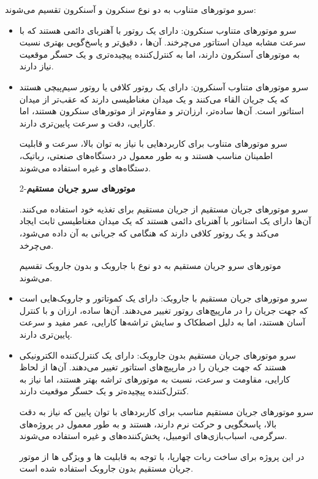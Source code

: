 سرو موتورهای متناوب به دو نوع سنکرون و آسنکرون تقسیم می‌شوند:
\begin{itemize}
\item
سرو موتورهای متناوب سنکرون: دارای یک روتور با آهنربای دائمی هستند که با سرعت مشابه میدان استاتور می‌چرخند. آن‌ها ، دقیق‌تر و پاسخ‌گویی بهتری نسبت به موتورهای آسنکرون دارند، اما به کنترل‌کننده پیچیده‌تری و یک حسگر موقعیت نیاز دارند.
\item
سرو موتورهای متناوب آسنکرون: دارای یک روتور کلافی یا روتور سیم‌پیچی هستند که یک جریان القاء می‌کنند و یک میدان مغناطیسی دارند که عقب‌‌تر از میدان استاتور است. آن‌ها ساده‌تر، ارزان‌تر و مقاوم‌تر از موتورهای سنکرون هستند، اما کارایی، دقت و سرعت پایین‌تری دارند.

سرو موتورهای متناوب برای کاربردهایی با نیاز به توان بالا، سرعت و قابلیت اطمینان مناسب هستند و به طور معمول در دستگاه‌های صنعتی، رباتیک، دستگاه‌های 
و غیره استفاده می‌شوند.

2-\textbf{موتورهای سرو جریان مستقیم}

سرو موتورهای جریان مستقیم از جریان مستقیم
برای تغذیه خود استفاده می‌کنند. آن‌ها دارای یک استاتور با آهنربای دائمی هستند که یک میدان مغناطیسی ثابت ایجاد می‌کند و یک روتور کلافی دارند که هنگامی که جریانی به آن داده می‌شود، می‌چرخد.

موتورهای سرو جریان مستقیم به دو نوع با جاروبک
\unskip{}
و بدون جاروبک
\unskip{}
 تقسیم می‌شوند.
\item
سرو موتورهای جریان مستقیم با جاروبک: دارای یک کموتاتور
\unskip{}
و جاروبک‌هایی است که جهت جریان را در مارپیچ‌های روتور تغییر می‌دهند. آن‌ها ساده، ارزان و با کنترل آسان هستند، اما به دلیل اصطکاک و سایش تراشه‌ها کارایی، عمر مفید و سرعت پایین‌تری دارند.
\item
سرو موتورهای جریان مستقیم بدون جاروبک: دارای یک کنترل‌کننده الکترونیکی هستند که جهت جریان را در مارپیچ‌های استاتور تغییر می‌دهند. آن‌ها از لحاظ کارایی، مقاومت و سرعت، نسبت به موتورهای تراشه بهتر هستند، اما نیاز به کنترل‌کننده پیچیده‌تر و یک حسگر موقعیت دارند.

سرو موتورهای جریان مستقیم مناسب برای کاربردهای با توان پایین که نیاز به دقت بالا، پاسخگویی و حرکت نرم دارند، هستند و به طور معمول در پروژه‌های سرگرمی، اسباب‌بازی‌های اتومبیل‌، پخش‌کننده‌های
و غیره استفاده می‌شوند.

در این پروژه برای ساخت ربات چهارپا، با توجه به قابلیت ها و ویژگی ها از موتور جریان مستقیم بدون جاروبک استفاده شده است.
\end{itemize}

